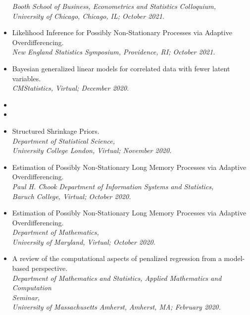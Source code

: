 \documentclass[11pt]{article}
\newcommand{\tab}{\hspace*{2em}}
\begin{document}
\begin{itemize}
	\tab \emph{Booth School of Business, Econometrics and Statistics Colloquium,} \\
	\tab \emph{University of Chicago, Chicago, IL; October 2021.} \vspace{-2mm}
	\item[] Likelihood Inference for Possibly Non-Stationary Processes via Adaptive Overdifferencing. \\
	\tab \emph{New England Statistics Symposium, Providence, RI; October 2021. }\vspace{-2mm}
	\item[] Bayesian generalized linear models for correlated data with fewer latent variables. \\
	\tab \emph{CMStatistics, Virtual; December 2020. } \vspace{-2mm}
	\item[]
	\item[]
	\item[] Structured Shrinkage Priors. \\
	\tab \emph{Department of Statistical Science,}\\ 
	\tab \emph{University College London, Virtual; November 2020.} \vspace{-2mm}
	\item[] Estimation of Possibly Non-Stationary Long Memory Processes via Adaptive \\
	Overdifferencing. \\
	\tab \emph{Paul H. Chook Department of Information Systems and Statistics,}\\ 
	\tab \emph{Baruch College, Virtual; October 2020.} \vspace{-2mm}
	\item[] Estimation of Possibly Non-Stationary Long Memory Processes via Adaptive \\
	Overdifferencing. \\
	\tab \emph{Department of Mathematics,}\\ 
	\tab \emph{University of Maryland, Virtual; October 2020.} \vspace{-2mm}
	\item[] A review of the computational aspects of penalized regression from a model-based perspective. \\
	\tab \emph{Department of Mathematics and Statistics, Applied Mathematics and Computation} \\
	\tab \emph{Seminar,}\\ 
	\tab \emph{University of Massachusetts Amherst, Amherst, MA; February 2020.} \vspace{-2mm}

\end{itemize}
\end{document}
